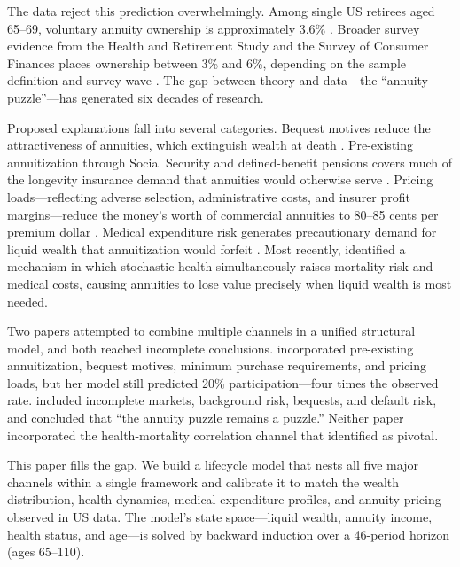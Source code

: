 \documentclass[12pt]{article}
\begin{document}
The data reject this prediction overwhelmingly. Among single US retirees aged 65--69, voluntary annuity ownership is approximately 3.6\% \citep{lockwood2012}. Broader survey evidence from the Health and Retirement Study and the Survey of Consumer Finances places ownership between 3\% and 6\%, depending on the sample definition and survey wave \citep{dushiwebb2004, poterbaventiwise2011}. The gap between theory and data---the ``annuity puzzle''---has generated six decades of research.

Proposed explanations fall into several categories. Bequest motives reduce the attractiveness of annuities, which extinguish wealth at death \citep{lockwood2012, kopczuklupton2007}. Pre-existing annuitization through Social Security and defined-benefit pensions covers much of the longevity insurance demand that annuities would otherwise serve \citep{dushiwebb2004, mitchell1999}. Pricing loads---reflecting adverse selection, administrative costs, and insurer profit margins---reduce the money's worth of commercial annuities to 80--85 cents per premium dollar \citep{mitchell1999, wettstein2021, finkelsteinpoterba2002}. Medical expenditure risk generates precautionary demand for liquid wealth that annuitization would forfeit \citep{denardi2010}. Most recently, \citet{reichlingsmetters2015} identified a mechanism in which stochastic health simultaneously raises mortality risk and medical costs, causing annuities to lose value precisely when liquid wealth is most needed.

Two papers attempted to combine multiple channels in a unified structural model, and both reached incomplete conclusions. \citet{pashchenko2013} incorporated pre-existing annuitization, bequest motives, minimum purchase requirements, and pricing loads, but her model still predicted 20\% participation---four times the observed rate. \citet{peijnenburg2016} included incomplete markets, background risk, bequests, and default risk, and concluded that ``the annuity puzzle remains a puzzle.'' Neither paper incorporated the health-mortality correlation channel that \citet{reichlingsmetters2015} identified as pivotal.

This paper fills the gap. We build a lifecycle model that nests all five major channels within a single framework and calibrate it to match the wealth distribution, health dynamics, medical expenditure profiles, and annuity pricing observed in US data. The model's state space---liquid wealth, annuity income, health status, and age---is solved by backward induction over a 46-period horizon (ages 65--110).
\end{document}
